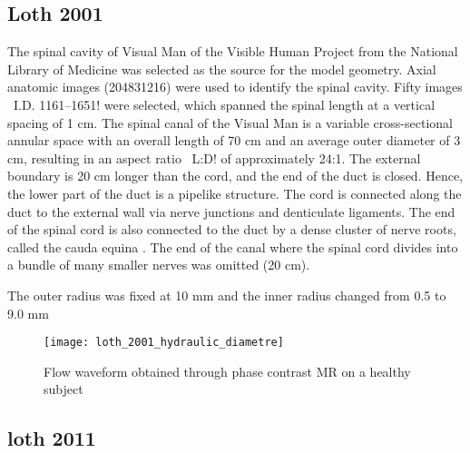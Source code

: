 \documentclass{report}
\begin{document}
\subsection{Loth 2001}

The spinal cavity of Visual Man of the Visible Human Project from the
National Library of Medicine  was selected as the source for 
the model geometry. Axial anatomic images (204831216) were
used to identify the spinal cavity. Fifty images ~I.D. 1161–1651!
were selected, which spanned the spinal length at a vertical spacing
of 1 cm. The spinal canal of the Visual Man is a variable cross-sectional annular
space with an overall length of 70 cm and an average outer diameter
of 3 cm, resulting in an aspect ratio ~L:D! of approximately 
24:1. The external boundary is 20 cm longer than the cord, and the
end of the duct is closed. Hence, the lower part of the duct is a
pipelike structure. The cord is connected along the duct to the
external wall via nerve junctions and denticulate ligaments. The
end of the spinal cord is also connected to the duct by a dense
cluster of nerve roots, called the cauda equina \cite{parson}. The end of the canal where the spinal cord divides into a bundle of many smaller nerves was omitted (20 cm).

The outer radius was fixed at 10 mm and the inner radius
changed from 0.5 to 9.0 mm

\begin{figure}[!h]
\centering
\caption{\label{anatomy} Flow waveform obtained through phase contrast MR on a healthy subject}
    \texttt{[image: loth\_2001\_hydraulic\_diametre]}
\end{figure}

\subsection{loth 2011}
\end{document}
